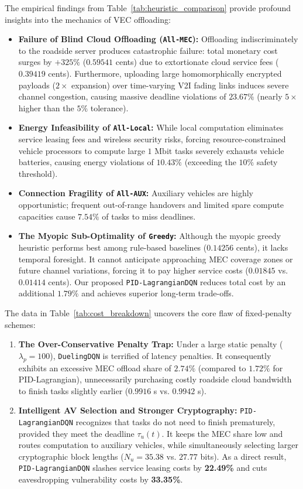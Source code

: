 \documentclass[12pt,a4paper]{article}
\begin{document}
The empirical findings from Table~\ref{tab:heuristic_comparison} provide profound insights into the mechanics of VEC offloading:
\begin{itemize}
    \item \textbf{Failure of Blind Cloud Offloading (\texttt{All-MEC}):} Offloading indiscriminately to the roadside server produces catastrophic failure: total monetary cost surges by $+325\%$ ($0.59541$ cents) due to extortionate cloud service fees ($0.39419$ cents). Furthermore, uploading large homomorphically encrypted payloads ($2\times$ expansion) over time-varying V2I fading links induces severe channel congestion, causing massive deadline violations of $23.67\%$ (nearly $5\times$ higher than the $5\%$ tolerance).
    \item \textbf{Energy Infeasibility of \texttt{All-Local}:} While local computation eliminates service leasing fees and wireless security risks, forcing resource-constrained vehicle processors to compute large $1\text{ Mbit}$ tasks severely exhausts vehicle batteries, causing energy violations of $10.43\%$ (exceeding the $10\%$ safety threshold).
    \item \textbf{Connection Fragility of \texttt{All-AUX}:} Auxiliary vehicles are highly opportunistic; frequent out-of-range handovers and limited spare compute capacities cause $7.54\%$ of tasks to miss deadlines.
    \item \textbf{The Myopic Sub-Optimality of \texttt{Greedy}:} Although the myopic greedy heuristic performs best among rule-based baselines ($0.14256$ cents), it lacks temporal foresight. It cannot anticipate approaching MEC coverage zones or future channel variations, forcing it to pay higher service costs ($0.01845$ vs. $0.01414$ cents). Our proposed \texttt{PID-LagrangianDQN} reduces total cost by an additional $1.79\%$ and achieves superior long-term trade-offs.
\end{itemize}

The data in Table~\ref{tab:cost_breakdown} uncovers the core flaw of fixed-penalty schemes:
\begin{enumerate}
    \item \textbf{The Over-Conservative Penalty Trap:} Under a large static penalty ($\lambda_p = 100$), \texttt{DuelingDQN} is terrified of latency penalties. It consequently exhibits an excessive MEC offload share of $2.74\%$ (compared to $1.72\%$ for PID-Lagrangian), unnecessarily purchasing costly roadside cloud bandwidth to finish tasks slightly earlier ($0.9916$ s vs. $0.9942$ s).
    \item \textbf{Intelligent AV Selection and Stronger Cryptography:} \texttt{PID-LagrangianDQN} recognizes that tasks do not need to finish prematurely, provided they meet the deadline $\tau_u(t)$. It keeps the MEC share low and routes computation to auxiliary vehicles, while simultaneously selecting larger cryptographic block lengths ($N_u = 35.38$ vs. $27.77$ bits). As a direct result, \texttt{PID-LagrangianDQN} slashes service leasing costs by \textbf{22.49\%} and cuts eavesdropping vulnerability costs by \textbf{33.35\%}.
\end{enumerate}
\end{document}
